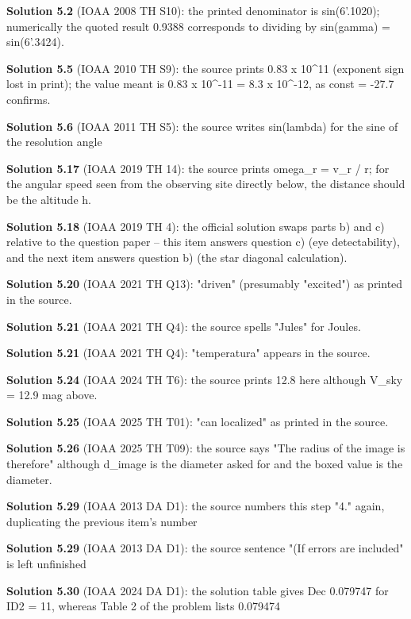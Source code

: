 \noindent\textbf{Solution 5.2} (IOAA 2008 TH S10): the printed denominator is sin(6'.1020); numerically the quoted result 0.9388 corresponds to dividing by sin(gamma) = sin(6'.3424).
\smallskip

\noindent\textbf{Solution 5.5} (IOAA 2010 TH S9): the source prints 0.83 x 10\^{}{11} (exponent sign lost in print); the value meant is 0.83 x 10\^{}{-11} = 8.3 x 10\^{}{-12}, as const = -27.7 confirms.
\smallskip

\noindent\textbf{Solution 5.6} (IOAA 2011 TH S5): the source writes sin(lambda) for the sine of the resolution angle
\smallskip

\noindent\textbf{Solution 5.17} (IOAA 2019 TH 14): the source prints omega\_r = v\_r / r; for the angular speed seen from the observing site directly below, the distance should be the altitude h.
\smallskip

\noindent\textbf{Solution 5.18} (IOAA 2019 TH 4): the official solution swaps parts b) and c) relative to the question paper -- this item answers question c) (eye detectability), and the next item answers question b) (the star diagonal calculation).
\smallskip

\noindent\textbf{Solution 5.20} (IOAA 2021 TH Q13): "driven" (presumably "excited") as printed in the source.
\smallskip

\noindent\textbf{Solution 5.21} (IOAA 2021 TH Q4): the source spells "Jules" for Joules.
\smallskip

\noindent\textbf{Solution 5.21} (IOAA 2021 TH Q4): "temperatura" appears in the source.
\smallskip

\noindent\textbf{Solution 5.24} (IOAA 2024 TH T6): the source prints 12.8 here although V\_sky = 12.9 mag above.
\smallskip

\noindent\textbf{Solution 5.25} (IOAA 2025 TH T01): "can localized" as printed in the source.
\smallskip

\noindent\textbf{Solution 5.26} (IOAA 2025 TH T09): the source says "The radius of the image is therefore" although d\_image is the diameter asked for and the boxed value is the diameter.
\smallskip

\noindent\textbf{Solution 5.29} (IOAA 2013 DA D1): the source numbers this step "4." again, duplicating the previous item's number
\smallskip

\noindent\textbf{Solution 5.29} (IOAA 2013 DA D1): the source sentence "(If errors are included" is left unfinished
\smallskip

\noindent\textbf{Solution 5.30} (IOAA 2024 DA D1): the solution table gives Dec 0.079747 for ID2 = 11, whereas Table 2 of the problem lists 0.079474
\smallskip

